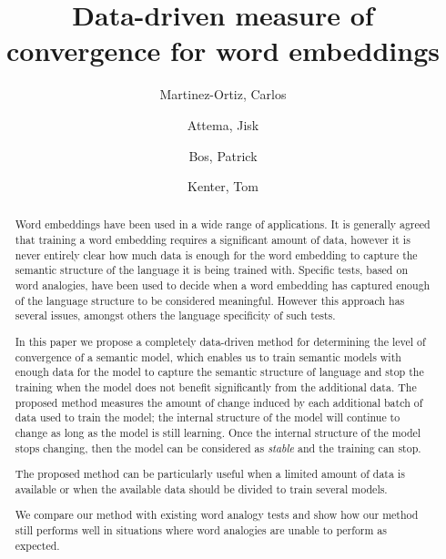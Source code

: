 \documentclass{article} %
\begin{document}
\title{Data-driven measure of convergence for word embeddings}
\author{
  Martinez-Ortiz, Carlos
  \and
  Attema, Jisk
  \and
  Bos, Patrick
  \and
  Kenter, Tom
}

\maketitle

\begin{abstract}
Word embeddings have been used in a wide range of applications. It is generally agreed that training a word embedding requires a significant amount of data, however it is never entirely clear how much data is enough for the word embedding to capture the semantic structure of the language it is being trained with. Specific tests, based on word analogies, have been used to decide when a word embedding has captured enough of the language structure to be considered meaningful. However this approach has several issues, amongst others the language specificity of such tests.

In this paper we propose a completely data-driven method for determining the level of convergence of a semantic model, which enables us to train semantic models with enough data for the model to capture the semantic structure of language and stop the training when the model does not benefit significantly from the additional data. The proposed method measures the amount of change induced by each additional batch of data used to train the model; the internal structure of the model will continue to change as long as the model is still learning. Once the internal structure of the model stops changing, then the model can be considered as \textit{stable} and the training can stop.

The proposed method can be particularly useful when a limited amount of data is available or when the available data should be divided to train several models.

We compare our method with existing word analogy tests and show how our method still performs well in situations where word analogies are unable to perform as expected.
\end{abstract}
\end{document}
